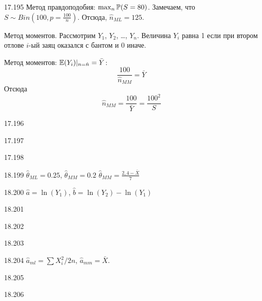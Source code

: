 \protect \hypertarget {soln:17.195}{}
\begin{solution}{{17.195}}
Метод правдоподобия: $\max_n \P(S=80)$. Замечаем, что $S \sim Bin\left(100, p=\frac{100}{n}\right)$. Отсюда, $\hat n_{ML} = 125$.

Метод моментов. Рассмотрим $Y_1$, $Y_2$, \ldots, $Y_n$. Величина $Y_i$ равна 1 если при втором отлове $i$-ый заяц оказался с бантом и 0 иначе.

Метод моментов: $\E(Y_i)|_{n=\hat n}=\bar Y$:
\[
\frac{100}{\hat n_{MM}}=\bar Y
\]
Отсюда
\[
\hat n_{MM} = \frac{100}{\bar Y} = \frac{100^2}{S}
\]
\end{solution}
\protect \hypertarget {soln:17.196}{}
\begin{solution}{{17.196}}
\end{solution}
\protect \hypertarget {soln:17.197}{}
\begin{solution}{{17.197}}
\end{solution}
\protect \hypertarget {soln:17.198}{}
\begin{solution}{{17.198}}
\end{solution}
\protect \hypertarget {soln:18.199}{}
\begin{solution}{{18.199}}
  $\hat{\theta}_{ML}=0.25$, $\hat{\theta}_{MM}=0.2$
  $\hat{\theta}_{MM}=\frac{2{,}4-\bar{X}}{7}$
\end{solution}
\protect \hypertarget {soln:18.200}{}
\begin{solution}{{18.200}}
$\hat{a}=\ln(Y_{1})$, $\hat{b}=\ln(Y_{2})-\ln(Y_{1})$
\end{solution}
\protect \hypertarget {soln:18.201}{}
\begin{solution}{{18.201}}
\end{solution}
\protect \hypertarget {soln:18.202}{}
\begin{solution}{{18.202}}
\end{solution}
\protect \hypertarget {soln:18.203}{}
\begin{solution}{{18.203}}
\end{solution}
\protect \hypertarget {soln:18.204}{}
\begin{solution}{{18.204}}
$\hat{a}_{ml}=\sum X_i^2/2n$, $\hat{a}_{mm}=\bar{X}$.
\end{solution}
\protect \hypertarget {soln:18.205}{}
\begin{solution}{{18.205}}
\end{solution}
\protect \hypertarget {soln:18.206}{}
\begin{solution}{{18.206}}
\end{solution}
